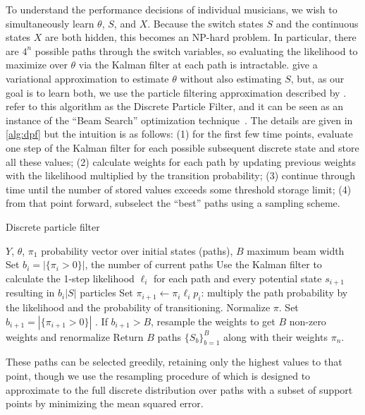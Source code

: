 \documentclass[12pt]{article}
\begin{document}
To understand the performance decisions of individual musicians, we
wish to simultaneously learn $\theta$, $S$, and $X$. Because the
switch states $S$ and the continuous states $X$ are both hidden, this becomes
an NP-hard problem. In particular, there are $4^n$ possible paths
through the switch variables, so evaluating the likelihood to maximize
over $\theta$ via the Kalman filter at each path is intractable. 
\citet{GhahramaniHinton2000} give a variational approximation to
estimate $\theta$ without also estimating $S$, but, as our goal is to
learn both, we use the particle filtering approximation described by
\citet{FearnheadClifford2003}. ~\cite{WhiteleyAndrieu2010} refer to
this algorithm as the Discrete Particle Filter, and it can be seen as
an instance of the ``Beam Search'' optimization
technique~\citep{Bisiani1992}. The details are given in
\autoref{alg:dpf} but the intuition is as follows: (1) for the first
few time points, evaluate
one step of the Kalman filter for each possible subsequent discrete
state and store all these values; (2) calculate weights for each path
by updating previous weights with the likelihood multiplied by the transition probability;
(3) continue through time until the number of stored values exceeds
some threshold storage limit; (4) from that point forward, subselect
the ``best'' paths using a sampling scheme.
\begin{algorithm}[t!]
  \caption{Discrete particle filter\label{alg:dpf}}
  \begin{algorithmic}[1]
  $Y$, $\theta$, $\pi_1$ probability vector over initial states
  (paths), $B$ maximum beam width
  \STATE Set $b_i=|\{\pi_i>0\}|$, the number of current paths
  \STATE Use %
  the Kalman filter to calculate the 1-step likelihood
  $\ell_i$ for each path and every potential state $s_{i+1}$ resulting in $b_i|S|$ particles
  \STATE Set $\pi_{i+1} \leftarrow \pi_i\ell_i p_i$: multiply the path
  probability by the likelihood and the probability of
  transitioning. Normalize $\pi$.
  \STATE Set $b_{i+1}=|\{\pi_{i+1}>0\}|$ . If $b_{i+1} > B$, resample the
  weights to get $B$ non-zero weights and renormalize
  \ENDFOR
  \STATE Return $B$ paths $\{S_b\}_{b=1}^B$ along with their weights $\pi_{n}$.
\end{algorithmic}
\end{algorithm}
These paths can be
selected greedily, retaining only the highest values to that point,
though we use the resampling procedure of
\citep{FearnheadClifford2003} which is designed to 
approximate to the full discrete distribution over paths with a subset
of support points by minimizing the mean squared
error.
\end{document}
